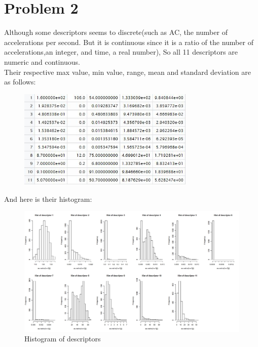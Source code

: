 \documentclass{article}
\begin{document}
\section{Problem 2}
Although some descriptors seems to discrete(such as AC, the number of accelerations per second. But it is continuous since it is a ratio of the number of accelerations,an integer, and time, a real number), So all 11 descriptors are numeric and continuous.\\ Their respective max value, min value, range, mean and standard deviation are as follows:
  \begin{figure}[H]
  \centering
  \includegraphics[width=0.75\textwidth]{chard.jpg}
  \label{}
  \end{figure}
And here is their histogram:
  \begin{figure}[H]
  \centering
  \includegraphics[width=1.2\textwidth]{Des.jpg}
  \caption{Histogram of descriptors}\label{}
  \end{figure}
\end{document}
